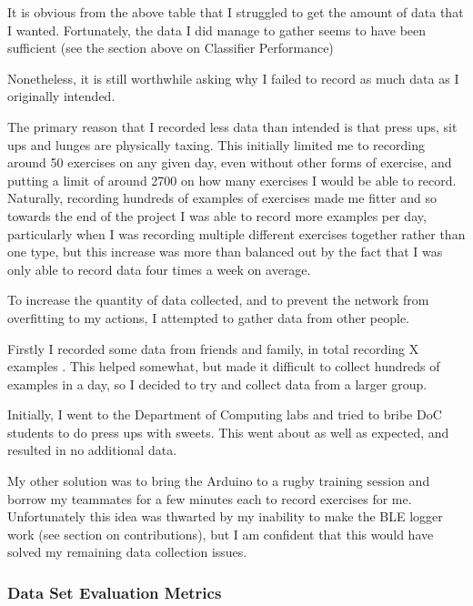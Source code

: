 \documentclass[a4paper]{article}
\begin{document}
It is obvious from the above table that I struggled to get the amount of data that I wanted. Fortunately, the data I did manage to gather seems to have been sufficient (see the section above on Classifier Performance)

Nonetheless, it is still worthwhile asking why I failed to record as much data as I originally intended. 

The primary reason that I recorded less data than intended is that press ups, sit ups and lunges are physically taxing.\cite{evref2} This initially limited me to recording around 50 exercises on any given day, even without other forms of exercise, and putting a limit of around 2700 on how many exercises I would be able to record.\cite{evref3} 
Naturally, recording hundreds of examples of exercises made me fitter and so towards the end of the project I was able to record more examples per day, particularly when I was recording multiple different exercises together rather than one type, but this increase was more than balanced out by the fact that I was only able to record data four times a week on average.

To increase the quantity of data collected, and to prevent the network from overfitting to my actions, I attempted to gather data from other people. 

Firstly I recorded some data from friends and family, in total recording X examples . This helped somewhat, but made it difficult to collect hundreds of examples in a day, so I decided to try and collect data from a larger group.

Initially, I went to the Department of Computing labs and tried to bribe DoC students to do press ups with sweets. This went about as well as expected, and resulted in no additional data. 

My other solution was to bring the Arduino to a rugby training session and borrow my teammates for a few minutes each to record exercises for me. Unfortunately this idea was thwarted by my inability to make the BLE logger work (see section on contributions), but I am confident that this would have solved my remaining data collection issues.


\subsubsection{Data Set Evaluation Metrics}
\end{document}
